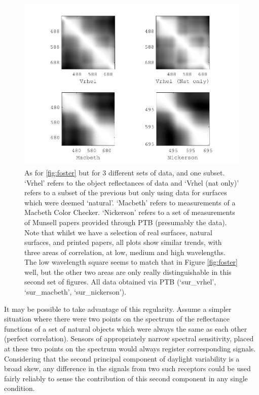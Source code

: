 \begin{figure}[htbp]
 \includegraphics[max width=\textwidth]{figs/comp/nat_cor/others.pdf}
 \caption{As for \ref{fig:foster} but for 3 different sets of data, and one subset. `Vrhel' refers to the object reflectances of \citet{vrhel_measurement_1994} data and `Vrhel (nat only)' refers to a subset of the previous but only using data for surfaces which were deemed `natural'. `Macbeth' refers to measurements of a Macbeth Color Checker. `Nickerson' refers to a set of measurements of Munsell papers provided through \gls{PTB} (presumably the \citet{kelly_tristimulus_1943} data). Note that whilst we have a selection of real surfaces, natural surfaces, and printed papers, all plots show similar trends, with three areas of correlation, at low, medium and high wavelengths. The low wavelength square seems to match that in Figure \ref{fig:foster} well, but the other two areas are only really distinguishable in this second set of figures. All data obtained via \gls{PTB} (`sur\_vrhel', `sur\_macbeth', `sur\_nickerson').}
 \label{fig:others}
\end{figure} 

It may be possible to take advantage of this regularity. Assume a simpler situation where there were two points on the spectrum of the reflectance functions of a set of natural objects which were always the same as each other (perfect correlation). Sensors of appropriately narrow spectral sensitivity, placed at these two points on the spectrum would always register corresponding signals. Considering that the second principal component of daylight variability is a broad skew, any difference in the signals from two such receptors could be used fairly reliably to sense the contribution of this second component in any single condition. 

